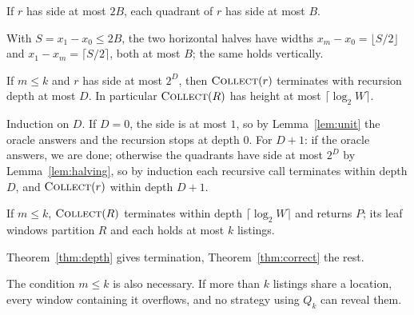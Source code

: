 \begin{lemma}\label{lem:halving}
If $r$ has side at most $2B$, each quadrant of $r$ has side at most $B$.
\end{lemma}
\begin{IEEEproof}
With $S=x_1-x_0\le 2B$, the two horizontal halves have widths
$x_m-x_0=\lfloor S/2\rfloor$ and $x_1-x_m=\lceil S/2\rceil$, both at most $B$;
the same holds vertically.
\end{IEEEproof}

\begin{theorem}\label{thm:depth}
If $m\le k$ and $r$ has side at most $2^D$, then $\textsc{Collect}(r)$
terminates with recursion depth at most $D$. In particular
$\textsc{Collect}(R)$ has height at most $\lceil\log_2 W\rceil$.
\end{theorem}
\begin{IEEEproof}
Induction on $D$. If $D=0$, the side is at most $1$, so by
Lemma~\ref{lem:unit} the oracle answers and the recursion stops at depth $0$.
For $D+1$: if the oracle answers, we are done; otherwise the quadrants have
side at most $2^D$ by Lemma~\ref{lem:halving}, so by induction each recursive
call terminates within depth $D$, and $\textsc{Collect}(r)$ within depth
$D+1$.
\end{IEEEproof}

\begin{corollary}\label{cor:total}
If $m\le k$, $\textsc{Collect}(R)$ terminates within depth
$\lceil\log_2 W\rceil$ and returns $P$; its leaf windows partition $R$ and
each holds at most $k$ listings.
\end{corollary}
\begin{IEEEproof}
Theorem~\ref{thm:depth} gives termination, Theorem~\ref{thm:correct} the rest.
\end{IEEEproof}

The condition $m\le k$ is also necessary. If more than $k$ listings share a
location, every window containing it overflows, and no strategy using $Q_k$
can reveal them.

